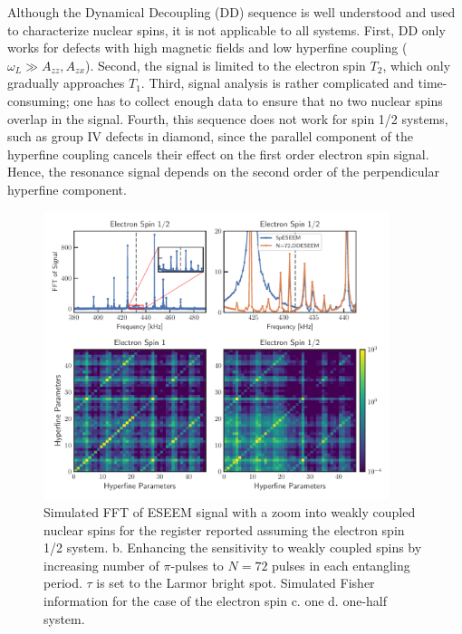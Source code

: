 \documentclass[%
 reprint,
superscriptaddress,
 amsmath,amssymb,
 aps,
]{revtex4-2}
\begin{document}
Although the Dynamical Decoupling (DD) sequence is well understood and used to characterize nuclear spins, it is not applicable to all systems.
First, DD only works for defects with high magnetic fields and low hyperfine coupling ($\omega_L \gg A_{zz}, A_{zx}$).
Second, the signal is limited to the electron spin $T_2$, which only gradually approaches $T_1$.
Third, signal analysis is rather complicated and time-consuming; one has to collect enough data to ensure that no two nuclear spins overlap in the signal.
Fourth, this sequence does not work for spin 1/2 systems, such as group IV defects in diamond, since the parallel component of the hyperfine coupling cancels their effect on the first order electron spin signal.
Hence, the resonance signal depends on the second order of the perpendicular hyperfine component.
\begin{figure}[htbp]
	\begin{center}
		\includegraphics[width=0.9\textwidth]{pict/eseem_compare2.pdf}
		\caption{Simulated FFT of ESEEM signal with a zoom into weakly coupled nuclear spins for the register reported \cite{abobeih2019atomic} assuming the electron spin 1/2 system. b. Enhancing the sensitivity to weakly coupled spins by increasing number of $\pi$-pulses to $N=72$ pulses in each entangling period. $\tau$ is set to the Larmor bright spot. Simulated Fisher information for the case of the electron spin c. one d. one-half system.}
		\label{fig:ddeseem}
	\end{center}
\end{figure}
\end{document}
